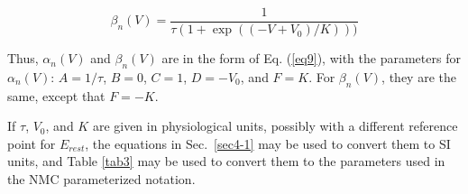 \documentclass[12pt]{article}
\begin{document}
\begin{equation}
\beta_n(V) = \frac{ 1 }{\tau (1 + \exp((-V + V_0) /K)))}
\label{eq16}
\end{equation}

Thus, $\alpha_n(V)$ and $\beta_n(V)$ are in the form of Eq. (\ref{eq9}),
with the parameters for $\alpha_n(V)$: $A = 1/\tau$, $B = 0$, $C = 1$,
$D = -V_0$, and $F = K$.  For $\beta_n(V)$, they are the same, except that
$F = -K$.

If $\tau$, $V_0$, and $K$ are given in physiological units, possibly with a
different reference point for $E_{rest}$, the equations in Sec.~\ref{sec4-1}
may be used to convert them to SI units, and Table \ref{tab3}
may be used to convert them to the parameters used in the NMC parameterized
notation.
\end{document}
